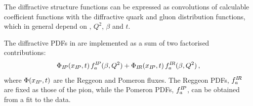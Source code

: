 The diffractive structure functions can be expressed as convolutions of 
calculable coefficient functions with the diffractive quark and gluon distribution functions,
 which in general depend on \xpom, $Q^2$, $\beta$ and $t$.

The diffractive PDFs \cite{Aktas:2006hy, zeus:diff2009} in \fitter are implemented as a sum 
of two factorised contributions:
\begin{equation}
 \Phi_{I\!P}(x_{I\!P},t)\, f^{{I\!P}}_{a}(\beta,Q^2)
  + 
 \Phi_{I\!R}(x_{I\!P},t)\, f^{{I\!R}}_{a}(\beta,Q^2)
 \,,
\end{equation} 
where $\Phi(x_{I\!P},t)$ are the Reggeon and Pomeron fluxes.
The Reggeon PDFs, $f^{{I\!R}}_{a}$ are fixed as those of the pion, while the Pomeron PDFs,
$f^{{I\!P}}_{a}$, can be obtained from a fit to the data.

